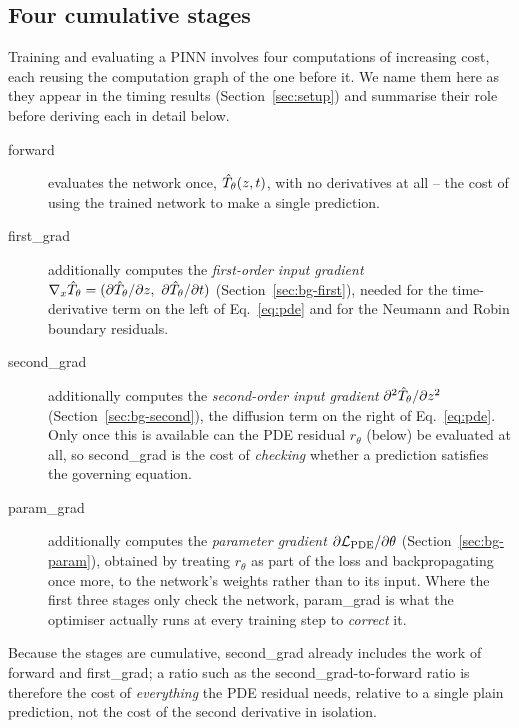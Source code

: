 \subsection{Four cumulative stages}
\label{sec:bg-stages}
Training and evaluating a PINN involves four computations of increasing cost, each reusing the computation
graph of the one before it. We name them here as they appear in the timing results (Section~\ref{sec:setup})
and summarise their role before deriving each in detail below.
\begin{description}
  \item[forward] evaluates the network once, $\hat T_\theta(z,t)$, with no derivatives at all -- the cost of using the
  trained network to make a single prediction.
  \item[first\_grad] additionally computes the \emph{first-order input gradient}
  $\nabla_x\Th=(\partial\Th/\partial z,\ \partial\Th/\partial t)$ (Section~\ref{sec:bg-first}), needed for the
  time-derivative term on the left of Eq.~\eqref{eq:pde} and for the Neumann and Robin boundary residuals.
  \item[second\_grad] additionally computes the \emph{second-order input gradient} $\partial^2\hat T_\theta/\partial z^2$
  (Section~\ref{sec:bg-second}), the diffusion term on the right of Eq.~\eqref{eq:pde}. Only once this is
  available can the PDE residual $r_\theta$ (below) be evaluated at all, so second\_grad is the cost of
  \emph{checking} whether a prediction satisfies the governing equation.
  \item[param\_grad] additionally computes the \emph{parameter gradient} $\partial\mathcal{L}_{\text{PDE}}/\partial\theta$
  (Section~\ref{sec:bg-param}), obtained by treating $r_\theta$ as part of the loss and backpropagating once
  more, to the network's weights rather than to its input. Where the first three stages only check the
  network, param\_grad is what the optimiser actually runs at every training step to \emph{correct} it.
\end{description}
Because the stages are cumulative, second\_grad already includes the work of forward and first\_grad; a ratio
such as the second\_grad-to-forward ratio is therefore the cost of \emph{everything} the PDE residual needs,
relative to a single plain prediction, not the cost of the second derivative in isolation.

